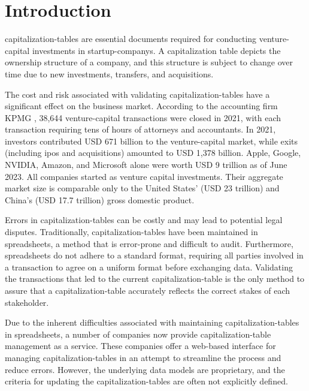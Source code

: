 \section{Introduction}\label{ch:introduction}

\Glspl{capitalization-table} are essential documents required for conducting \gls{venture-capital} investments in \glspl{startup-company}. A capitalization table depicts the ownership structure of a company, and this structure is subject to change over time due to new investments, transfers, and acquisitions.

The cost and risk associated with validating \glspl{capitalization-table} have a significant effect on the business market. According to the accounting firm KPMG \cite{kpmgGlobalVenture}, 38,644 \gls{venture-capital} transactions were closed in 2021, with each transaction requiring tens of hours of attorneys and accountants. In 2021, investors contributed USD 671 billion to the \gls{venture-capital} market, while exits (including \glspl{ipo} and \glspl{acquisition}) amounted to USD 1,378 billion. Apple, Google, NVIDIA, Amazon, and Microsoft alone were worth USD 9 trillion as of June 2023. All companies started as venture capital investments. Their aggregate market size is comparable only to the United States' (USD 23 trillion) and China's (USD 17.7 trillion) gross domestic product.


Errors in \glspl{capitalization-table} can be costly and may lead to potential legal disputes. Traditionally, \glspl{capitalization-table} have been maintained in spreadsheets, a method that is error-prone and difficult to audit. Furthermore, spreadsheets do not adhere to a standard format, requiring all parties involved in a transaction to agree on a uniform format before exchanging data.
%
Validating the \glspl{transaction} that led to the current \gls{capitalization-table} is the only method to assure that a \gls{capitalization-table} accurately reflects the correct stakes of each \gls{stakeholder}.

Due to the inherent difficulties associated with maintaining \glspl{capitalization-table} in spreadsheets, a number of companies now provide \gls{capitalization-table} management as a service. These companies offer a web-based interface for managing \glspl{capitalization-table} in an attempt to streamline the process and reduce errors. However, the underlying data models are proprietary, and the criteria for updating the \glspl{capitalization-table} are often not explicitly defined.

